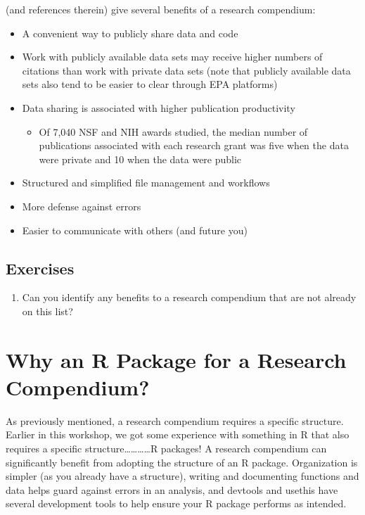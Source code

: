 \documentclass[
]{book}
\providecommand{\tightlist}{%
  \setlength{\itemsep}{0pt}\setlength{\parskip}{0pt}}
\begin{document}
\citet{marwick2018packaging} (and references therein) give several benefits of a research compendium:

\begin{itemize}
\tightlist
\item
  A convenient way to publicly share data and code
\item
  Work with publicly available data sets may receive higher numbers of citations than work with private data sets (note that publicly available data sets also tend to be easier to clear through EPA platforms)
\item
  Data sharing is associated with higher publication productivity

  \begin{itemize}
  \tightlist
  \item
    Of 7,040 NSF and NIH awards studied, the median number of publications associated with each research grant was five when the data were private and 10 when the data were public
  \end{itemize}
\item
  Structured and simplified file management and workflows
\item
  More defense against errors
\item
  Easier to communicate with others (and future you)
\end{itemize}

\hypertarget{ex-set8}{%
\subsection{Exercises}\label{ex-set8}}

\begin{enumerate}
\def\labelenumi{\arabic{enumi}.}
\tightlist
\item
  Can you identify any benefits to a research compendium that are not already on this list?
\end{enumerate}

\hypertarget{why-r-pack-for-rc}{%
\section{Why an R Package for a Research Compendium?}\label{why-r-pack-for-rc}}

As previously mentioned, a research compendium requires a specific structure. Earlier in this workshop, we got some experience with something in R that also requires a specific structure\ldots\ldots\ldots\ldots R packages! A research compendium can significantly benefit from adopting the structure of an R package. Organization is simpler (as you already have a structure), writing and documenting functions and data helps guard against errors in an analysis, and devtools and usethis have several development tools to help ensure your R package performs as intended.
\end{document}
